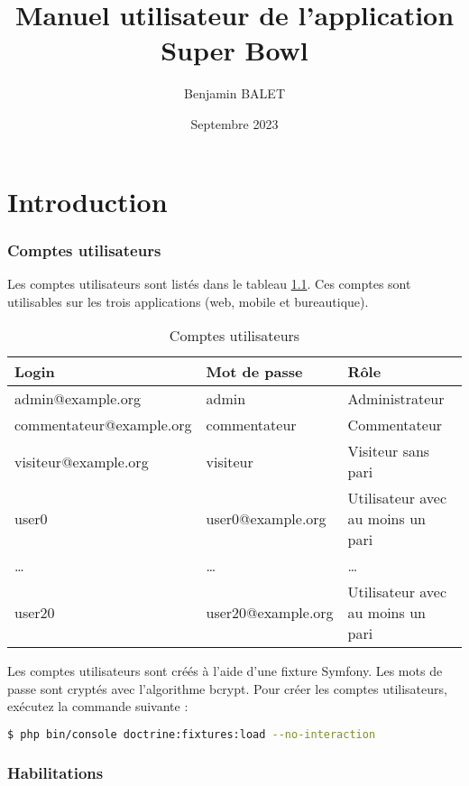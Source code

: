 \documentclass{book}
\title{Manuel utilisateur de l'application Super Bowl}
\author{Benjamin BALET}
\date{Septembre 2023}
\begin{document}
\maketitle{}
\tableofcontents
\newpage


\chapter{Introduction}
\subsection{Comptes utilisateurs}

Les comptes utilisateurs sont listés dans le tableau \ref{tab:table1}. Ces comptes sont utilisables sur les
trois applications (web, mobile et bureautique).

\begin{table}
  \label{tab:table1}
    \begin{tabular}{l|l|l} \toprule
      \textbf{Login} & \textbf{Mot de passe} & \textbf{Rôle}\\ \hline
      admin@example.org & admin & Administrateur  \\ \hline
      commentateur@example.org & commentateur & Commentateur  \\ \hline
      visiteur@example.org & visiteur & Visiteur sans pari  \\ \hline
      user0 & user0@example.org  & Utilisateur avec au moins un pari  \\ \hline
      \ldots & \ldots  & \ldots  \\ \hline
      user20 & user20@example.org & Utilisateur avec au moins un pari  \\ \hline
    \end{tabular}
    \caption{Comptes utilisateurs}
\end{table}

Les comptes utilisateurs sont créés à l'aide d'une fixture Symfony. Les mots de passe sont cryptés avec 
l'algorithme bcrypt. Pour créer les comptes utilisateurs, exécutez la commande suivante :
\begin{lstlisting}[language=bash]
  $ php bin/console doctrine:fixtures:load --no-interaction
\end{lstlisting}


\subsection{Habilitations}
\end{document}
